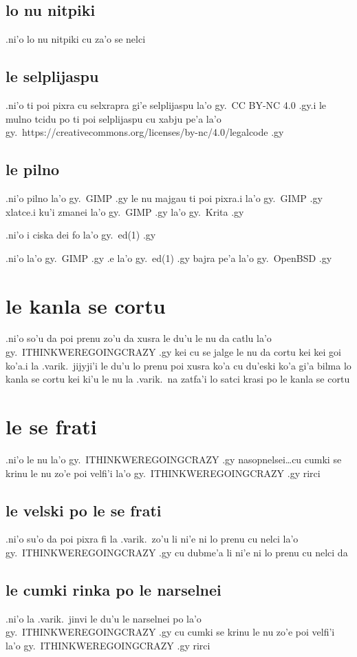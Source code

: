 \documentclass{report}
\begin{document}
\subsection{lo nu nitpiki}
.ni'o lo nu nitpiki cu za'o se nelci

\subsection{le selplijaspu}
.ni'o ti poi pixra cu selxrapra gi'e selplijaspu la'o gy.\ CC BY-NC 4.0 .gy\@ .i le mulno tcidu po ti poi selplijaspu cu xabju pe'a la'o gy.\ https://creativecommons.org/licenses/by-nc/4.0/legalcode .gy

\subsection{le pilno}
.ni'o pilno la'o gy.\ GIMP .gy le nu majgau ti poi pixra\@ .i  la'o gy.\ GIMP .gy xlatce\@ .i ku'i zmanei la'o gy.\ GIMP .gy la'o gy.\ Krita .gy

.ni'o i ciska dei fo la'o gy.\ ed(1) .gy

.ni'o la'o gy.\ GIMP .gy .e la'o gy.\ ed(1) .gy bajra pe'a la'o gy.\ OpenBSD .gy

\section{le kanla se cortu}
.ni'o so'u da poi prenu zo'u da xusra le du'u le nu da catlu la'o gy.\ ITHINKWEREGOINGCRAZY .gy kei cu se jalge le nu da cortu kei kei goi ko'a\@  .i la .varik.\ jijyji'i le du'u lo prenu poi xusra ko'a cu du'eski ko'a gi'a bilma lo kanla se cortu kei ki'u le nu la .varik.\ na zatfa'i lo satci krasi po le kanla se cortu

\section{le se frati}
.ni'o le nu la'o gy.\ ITHINKWEREGOINGCRAZY .gy nasopnelsei\ldots cu cumki se krinu le nu zo'e poi velfi'i la'o gy.\ ITHINKWEREGOINGCRAZY .gy rirci

\subsection{le velski po le se frati}
.ni'o su'o da poi pixra fi la .varik.\ zo'u li ni'e ni lo prenu cu nelci la'o gy.\ ITHINKWEREGOINGCRAZY .gy cu dubme'a li ni'e ni lo prenu cu nelci da

\subsection{le cumki rinka po le narselnei}
.ni'o la .varik.\ jinvi le du'u le narselnei po la'o gy.\ ITHINKWEREGOINGCRAZY .gy  cu cumki se krinu le nu zo'e poi velfi'i la'o gy.\ ITHINKWEREGOINGCRAZY .gy rirci
\end{document}
